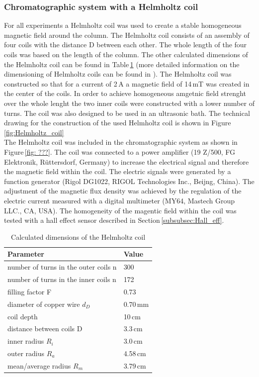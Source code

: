 \subsubsection{Chromatographic system with a Helmholtz coil}
\label{subsubsec:helm_coil}
For all experiments a Helmholtz coil was used to create a stable homogeneous magnetic field around the column. The Helmholtz coil consists of an assembly of four coils with the distance D between each other. The whole length of the four coils was based on the length of the column. The other calculated dimensions of the Helmholtz coil can be found in Table\,\ref{table:Helmholtz_coil} (more detailed information on the dimensioning of Helmholtz coils can be found in \cite{wotruba1968verbesserung,wotruba1969massive,heller1955erzeugung}). The Helmholtz coil was constructed so that for a current of 2\,A a magnetic field of 14\,mT was created in the center of the coils. In order to achieve homogeneous amgetnic field strenght over the whole lenght the two inner coils were constructed with a lower number of turns. The coil was also designed to be used in an ultrasonic bath. The technical drawing for the construction of the used Helmholtz coil is shown in Figure\,\ref{fig:Helmholtz_coil}\\  
The Helmholtz coil was included in the chromatographic system as shown in Figure\,\ref{fig: ???}. The coil was connected to a power amplifier (19 Z/500, FG Elektronik, Rüttersdorf, Germany) to increase the electrical signal and therefore the magnetic field within the coil. The electric signals were generated by a function generator (Rigol DG1022, RIGOL Technologies Inc., Beijng, China). The adjustment of the magnetic flux density was achieved by the regulation of the electric current measured with a digital multimeter (MY64, Mastech Group LLC., CA, USA). The homogeneity of the magentic field within the coil was tested with a hall effect sensor described in Section\,\ref{subsubsec:Hall_eff}.    

\begin{table}[H]
\centering
\caption[Dimensions of the Helmholtz coil]{Calculated dimensions of the Helmholtz coil}
\label{table:Helmholtz_coil}
\begin{tabular}{ll}\hline
Parameter &  Value \\
\hline\hline
 number of turns in the outer coils n & 300 \\
 number of turns in the inner coils n & 172 \\
 filling factor F & 0.73\\
 diameter of copper wire $d_{D}$ & 0.70\,mm\\
 coil depth & 10\,cm\\
 distance between coils D & 3.3\,cm \\
 inner radius $R_{i}$ & 3.0\,cm\\ 
 outer radius $R_{a}$ & 4.58\,cm\\
 mean/average radius $R_{m}$ & 3.79\,cm\\
 \hline
\end{tabular}
\end{table}


